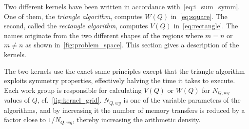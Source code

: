 \documentclass[11pt,twoside]{report}
\begin{document}
Two different kernels have been written in accordance with~\cref{eq:i_sum_symm}. One of them, the {\it triangle algorithm}, computes $W(Q)$ in~\cref{eq:square}. The second, called the {\it rectangle algorithm}, computes $V(Q)$ in~\cref{eq:rectangle}. The names originate from the two different shapes of the regions where $m = n$ or $m \neq n$ as shown in~\cref{fig:problem_space}. This section gives a description of the kernels.


\indent The two kernels use the exact same principles except that the triangle algorithm exploits  symmetry properties, effectively halving the time it takes to execute. Each work group is responsible for calculating $V(Q)$ or $W(Q)$ for $N_{Q,wg}$ values of $Q$, cf.~\cref{fig:kernel_grid}. $N_{Q,wg}$ is one of the variable  parameters of the algorithms, and by increasing it the number of memory transfers is reduced by a factor close to $1/N_{Q,wg}$, thereby increasing the arithmetic density.
\end{document}
